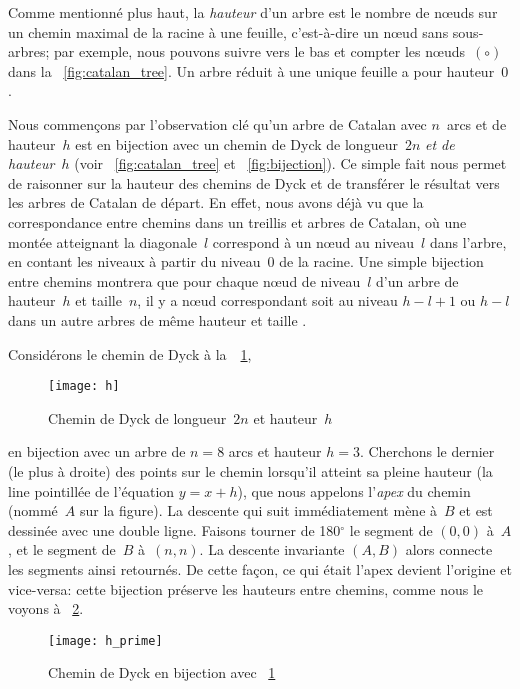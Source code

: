 Comme mentionné plus haut, la \emph{hauteur} d'un arbre est le nombre
de n{\oe}uds sur un chemin maximal de la racine à une feuille,
c'est-à-dire un n{\oe}ud sans sous-arbres; par exemple, nous pouvons
suivre vers le bas et compter les n{\oe}uds~\((\circ)\) dans la
\fig~\ref{fig:catalan_tree}. Un arbre réduit à une unique feuille a
pour hauteur~\(0\).

Nous commençons par l'observation clé qu'un arbre de Catalan avec
\(n\)~arcs et de hauteur~\(h\) est en bijection avec un chemin de Dyck
de longueur~\(2n\) \emph{et de hauteur~\(h\)} (voir
\fig~\vref{fig:catalan_tree} et \fig~\ref{fig:bijection}). Ce simple
fait nous permet de raisonner sur la hauteur des chemins de Dyck et de
transférer le résultat vers les arbres de Catalan de départ. En effet,
nous avons déjà vu que la correspondance entre chemins dans un
treillis et arbres de Catalan, où une montée atteignant la
diagonale~\(l\) correspond à un nœud au niveau~\(l\) dans l'arbre, en
contant les niveaux à partir du niveau~\(0\) de la racine. Une simple
bijection entre chemins montrera que pour chaque nœud de niveau~\(l\)
d'un arbre de hauteur~\(h\) et taille~\(n\), il y a nœud correspondant
soit au niveau \(h-l+1\) ou \(h-l\) dans un autre arbres de même
hauteur et taille \citep{Rinderknecht_2013d}.

Considérons le chemin de Dyck à la~\Fig~\ref{fig:h},
\begin{figure}
\centering
\texttt{[image: h]}
\caption{Chemin de Dyck de longueur~\(2n\) et hauteur~\(h\)}
\label{fig:h}
\end{figure}
en bijection avec un arbre de \(n=8\) arcs et hauteur
\(h=3\). Cherchons le dernier (le plus à droite) des points sur le
chemin lorsqu'il atteint sa pleine hauteur (la line pointillée de
l'équation \(y = x + h\)), que nous appelons l'\emph{apex} du chemin
(nommé~\(A\) sur la figure). La descente qui suit immédiatement mène
à~\(B\) et est dessinée avec une double ligne. Faisons tourner de
180$^\circ$ le segment de $(0,0)$ à~$A$, et le segment de~$B$
à~$(n,n)$. La descente invariante $(A,B)$ alors connecte les segments
ainsi retournés. De cette façon, ce qui était l'apex devient l'origine
et vice-versa: cette bijection préserve les hauteurs entre chemins,
comme nous le voyons à \fig~\ref{fig:h_prime}.
\begin{figure}
\centering
\texttt{[image: h\_prime]}
\caption{Chemin de Dyck en bijection avec \fig~\ref{fig:h}}
\label{fig:h_prime}
\end{figure}

